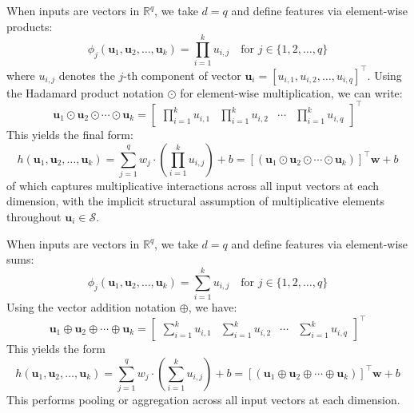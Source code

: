 \documentclass[10pt]{article} %
\begin{document}
\begin{definition}
    When inputs are vectors in $\mathbb{R}^{q}$, we take $d = q$ and define features via element-wise products:
        \begin{equation}
            \phi_j(\mathbf{u}_1, \mathbf{u}_2, \ldots, \mathbf{u}_k) = \prod_{i=1}^{k} u_{i,j} \quad \text{for } j \in \{1, 2, \ldots, q\}
        \end{equation}
        where $u_{i,j}$ denotes the $j$-th component of vector $\mathbf{u}_i = [u_{i,1}, u_{i,2}, \ldots, u_{i,q}]^{\top}$. Using the Hadamard product notation $\odot$ for element-wise multiplication, we can write:
        \begin{equation}
            \mathbf{u}_1 \odot \mathbf{u}_2 \odot \cdots \odot \mathbf{u}_k = \begin{bmatrix} \displaystyle{\prod_{i=1}^{k} u_{i,1}} & \displaystyle{\prod_{i=1}^{k} u_{i,2}} & \cdots & \displaystyle{\prod_{i=1}^{k} u_{i,q}} \end{bmatrix}^{\top}
        \end{equation}
        This yields the final form:
        \begin{equation}
            h(\mathbf{u}_1, \mathbf{u}_2, \ldots, \mathbf{u}_k) = \sum_{j=1}^{q} w_j \cdot \left(\prod_{i=1}^{k} u_{i,j}\right) + b = [(\mathbf{u}_1 \odot \mathbf{u}_2 \odot \cdots \odot \mathbf{u}_k)]^{\top}\mathbf{w} + b
        \end{equation}
        of which captures multiplicative interactions across all input vectors at each dimension, with the implicit structural assumption of multiplicative elements throughout $\mathbf{u}_{i}\in\mathcal{S}$. 
\end{definition}
\begin{definition}
    When inputs are vectors in $\mathbb{R}^{q}$, we take $d = q$ and define features via element-wise sums:
        \begin{equation}
            \phi_j(\mathbf{u}_1, \mathbf{u}_2, \ldots, \mathbf{u}_k) = \sum_{i=1}^{k} u_{i,j} \quad \text{for } j \in \{1, 2, \ldots, q\}
        \end{equation}
        Using the vector addition notation $\oplus$, we have:
        \begin{equation}
            \mathbf{u}_1 \oplus \mathbf{u}_2 \oplus \cdots \oplus \mathbf{u}_k = \begin{bmatrix} \displaystyle{\sum_{i=1}^{k} u_{i,1}} & \displaystyle{\sum_{i=1}^{k} u_{i,2}} & \cdots & \displaystyle{\sum_{i=1}^{k} u_{i,q}} \end{bmatrix}^{\top}
        \end{equation}
        This yields the form
        \begin{equation}
            h(\mathbf{u}_1, \mathbf{u}_2, \ldots, \mathbf{u}_k) = \sum_{j=1}^{q} w_j \cdot \left(\sum_{i=1}^{k} u_{i,j}\right) + b = [(\mathbf{u}_1 \oplus \mathbf{u}_2 \oplus \cdots \oplus \mathbf{u}_k)]^{\top}\mathbf{w} + b
        \end{equation}
        This performs pooling or aggregation across all input vectors at each dimension. 
\end{definition}
\end{document}
